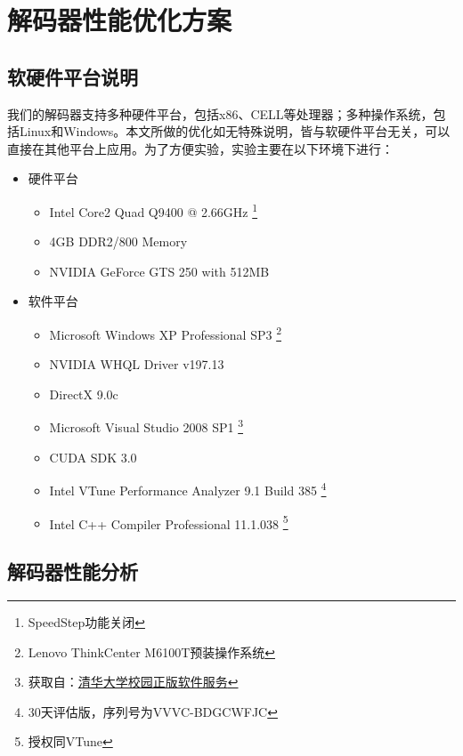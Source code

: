 

\chapter{解码器性能优化方案}
\label{cha:optapproach}

\section{软硬件平台说明}
\label{sec:platformdesc}

我们的解码器支持多种硬件平台，包括x86、CELL等处理器；多种操作系统，包括Linux和Windows。本文所做的优化如无特殊说明，皆与软硬件平台无关，可以直接在其他平台上应用。为了方便实验，实验主要在以下环境下进行：

\begin{itemize}
\item {硬件平台}

\begin{itemize}
\item Intel Core2 Quad Q9400 @ 2.66GHz
	\footnote{SpeedStep功能关闭}
\item 4GB DDR2/800 Memory
\item NVIDIA GeForce GTS 250 with 512MB
\end{itemize}

\item {软件平台}

\begin{itemize}
\item Microsoft Windows XP Professional SP3
	\footnote{Lenovo ThinkCenter M6100T预装操作系统}
\item NVIDIA WHQL Driver v197.13
\item DirectX 9.0c
\item Microsoft Visual Studio 2008 SP1
	\footnote{获取自：\href{http://helpdesk.tsinghua.edu.cn/yhfw/yhfw_zbrj_tz.jsp}{清华大学校园正版软件服务}}
\item CUDA SDK 3.0
\item Intel VTune Performance Analyzer 9.1 Build 385
	\footnote{30天评估版，序列号为VVVC-BDGCWFJC}
\item Intel C++ Compiler Professional 11.1.038
	\footnote{授权同VTune}
\end{itemize}

\end{itemize}


\section{解码器性能分析}
\label{sec:decoderprofiling}

